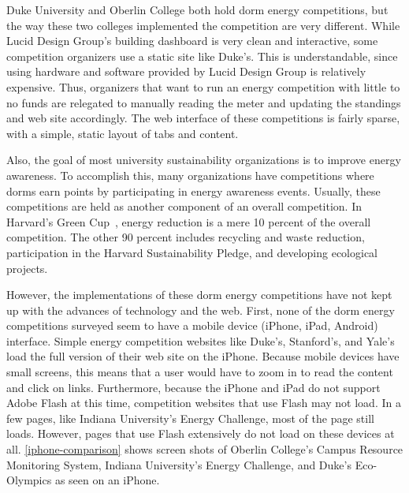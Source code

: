 Duke University and Oberlin College both hold dorm energy competitions, but the way these two colleges implemented the competition are very different.  While Lucid Design Group's building dashboard is very clean and interactive, some competition organizers use a static site like Duke's.  This is understandable, since using hardware and software provided by Lucid Design Group is relatively expensive.  Thus, organizers that want to run an energy competition with little to no funds are relegated to manually reading the meter and updating the standings and web site accordingly.  The web interface of these competitions is fairly sparse, with a simple, static layout of tabs and content.

Also, the goal of most university sustainability organizations is to improve energy awareness.  To accomplish this, many organizations have competitions where dorms earn points by participating in energy awareness events.  Usually, these competitions are held as another component of an overall competition. In Harvard's Green Cup~\cite{harvard-greencup}, energy reduction is a mere 10 percent of the overall competition. The other 90 percent includes recycling and waste reduction, participation in the Harvard Sustainability Pledge, and developing ecological projects.

However, the implementations of these dorm energy competitions have not kept up with the advances of technology and the web.  First, none of the dorm energy competitions surveyed seem to have a mobile device (iPhone, iPad, Android) interface.  Simple energy competition websites like Duke's, Stanford's, and Yale's load the full version of their web site on the iPhone.  Because mobile devices have small screens, this means that a user would have to zoom in to read the content and click on links.  Furthermore, because the iPhone and iPad do not support Adobe Flash at this time, competition websites that use Flash may not load.  In a few pages, like Indiana University's Energy Challenge, most of the page still loads.  However, pages that use Flash extensively do not load on these devices at all.  \autoref{iphone-comparison} shows screen shots of Oberlin College's Campus Resource Monitoring System, Indiana University's Energy Challenge,  and Duke's Eco-Olympics as seen on an iPhone.

